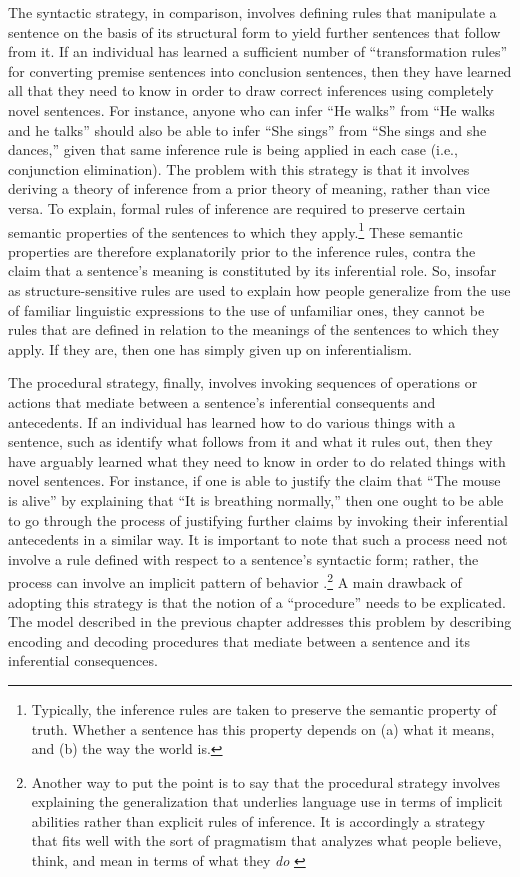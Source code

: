The syntactic strategy, in comparison, involves defining rules that manipulate a sentence on the basis of its structural form to yield further sentences that follow from it. If an individual has learned a sufficient number of ``transformation rules'' for converting premise sentences into conclusion sentences, then they have learned all that they need to know in order to draw correct inferences using completely novel sentences. For instance, anyone who can infer ``He walks'' from ``He walks and he talks'' should also be able to infer ``She sings'' from ``She sings and she dances,'' given that same inference rule is being applied in each case (i.e., conjunction elimination). The problem with this strategy is that it involves deriving a theory of inference from a prior theory of meaning, rather than vice versa. To explain, formal rules of inference are required to preserve certain semantic properties of the sentences to which they apply.\footnote{Typically, the inference rules are taken to preserve the semantic property of truth. Whether a sentence has this property depends on (a) what it means, and (b) the way the world is.} These semantic properties are therefore explanatorily prior to the inference rules, contra the claim that a sentence's meaning is constituted by its inferential role. So, insofar as structure-sensitive rules are used to explain how people generalize from the use of familiar linguistic expressions to the use of unfamiliar ones, they cannot be rules that are defined in relation to the meanings of the sentences to which they apply. If they are, then one has simply given up on inferentialism.

The procedural strategy, finally, involves invoking sequences of operations or actions that mediate between a sentence's inferential consequents and antecedents. If an individual has learned how to do various things with a sentence, such as identify what follows from it and what it rules out, then they have arguably learned what they need to know in order to do related things with novel sentences. For instance, if one is able to justify the claim that ``The mouse is alive'' by explaining that ``It is breathing normally,'' then one ought to be able to go through the process of justifying further claims by invoking their inferential antecedents in a similar way. It is important to note that such a process need not involve a rule defined with respect to a sentence's syntactic form; rather, the process can involve an implicit pattern of behavior \citep{Brandom:1994}.\footnote{Another way to put the point is to say that the procedural strategy involves explaining the generalization that underlies language use in terms of implicit abilities rather than explicit rules of inference. It is accordingly a strategy that fits well with the sort of pragmatism that analyzes what people believe, think, and mean in terms of what they \textit{do} \citep{Brandom:2011,Brandom:1994,Misak:2007,Misak:2013}} A main drawback of adopting this strategy is that the notion of a ``procedure'' needs to be explicated. The model described in the previous chapter addresses this problem by describing encoding and decoding procedures that mediate between a sentence and its inferential consequences. 

